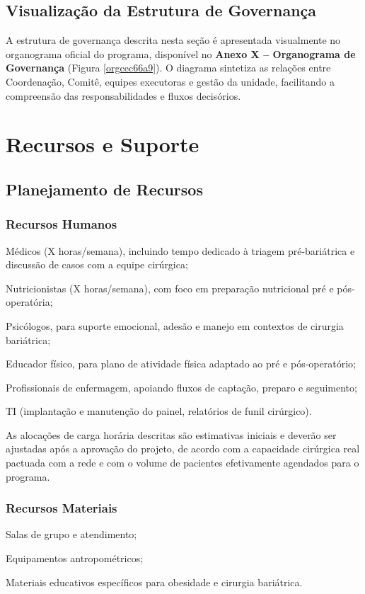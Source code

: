 \documentclass[12pt]{article}
\begin{document}
\subsection{Visualização da Estrutura de Governança}
\label{sec:org6b54bd0}
A estrutura de governança descrita nesta seção é apresentada visualmente no organograma oficial do programa, disponível no \textbf{Anexo X – Organograma de Governança} (Figura \ref{orgcec66a9}). O diagrama sintetiza as relações entre Coordenação, Comitê, equipes executoras e gestão da unidade, facilitando a compreensão das responsabilidades e fluxos decisórios.

\FGVNewPage
\section{Recursos e Suporte}
\label{sec:orge8883ea}
\subsection{Planejamento de Recursos}
\label{sec:org3846049}
\subsubsection{Recursos Humanos}
\label{sec:orgf82c861}
\begin{hlevelthree}
\item Médicos (X horas/semana), incluindo tempo dedicado à triagem pré-bariátrica e discussão de casos com a equipe cirúrgica;
\item Nutricionistas (X horas/semana), com foco em preparação nutricional pré e pós-operatória;
\item Psicólogos, para suporte emocional, adesão e manejo em contextos de cirurgia bariátrica;
\item Educador físico, para plano de atividade física adaptado ao pré e pós-operatório;
\item Profissionais de enfermagem, apoiando fluxos de captação, preparo e seguimento;
\item TI (implantação e manutenção do painel, relatórios de funil cirúrgico).
\end{hlevelthree}

As alocações de carga horária descritas são estimativas iniciais e deverão ser ajustadas após a aprovação do projeto, de acordo com a capacidade cirúrgica real pactuada com a rede e com o volume de pacientes efetivamente agendados para o programa.

\subsubsection{Recursos Materiais}
\label{sec:org41f0c12}
\begin{hlevelthree}
\item Salas de grupo e atendimento;
\item Equipamentos antropométricos;
\item Materiais educativos específicos para obesidade e cirurgia bariátrica.
\end{hlevelthree}
\end{document}
